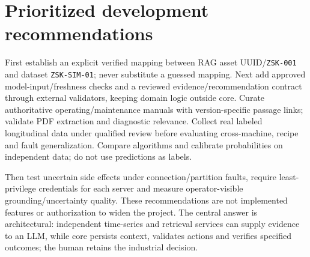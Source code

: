 \section{Prioritized development recommendations}
First establish an explicit verified mapping between RAG asset UUID/\texttt{ZSK-001} and dataset \texttt{ZSK-SIM-01}; never substitute a guessed mapping. Next add approved model-input/freshness checks and a reviewed evidence/recommendation contract through external validators, keeping domain logic outside core. Curate authoritative operating/maintenance manuals with version-specific passage links; validate PDF extraction and diagnostic relevance. Collect real labeled longitudinal data under qualified review before evaluating cross-machine, recipe and fault generalization. Compare algorithms and calibrate probabilities on independent data; do not use predictions as labels.

Then test uncertain side effects under connection/partition faults, require least-privilege credentials for each server and measure operator-visible grounding/uncertainty quality. These recommendations are not implemented features or authorization to widen the project. The central answer is architectural: independent time-series and retrieval services can supply evidence to an LLM, while core persists context, validates actions and verifies specified outcomes; the human retains the industrial decision.
